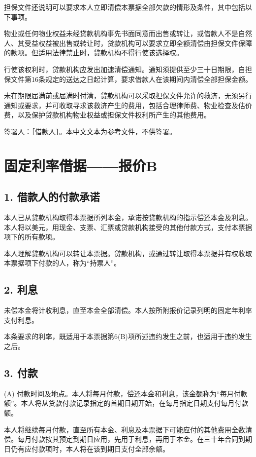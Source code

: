 \documentclass[UTF8,fontset=none,11pt,a4paper]{ctexart}
\begin{document}
担保文件还说明可以要求本人立即清偿本票据全部欠款的情形及条件，其中包括以下事项。


物业或任何物业权益未经贷款机构事先书面同意而出售或转让，或借款人不是自然人、其受益权益被出售或转让时，贷款机构可以要求立即全额清偿由担保文件保障的款项。但适用法律禁止时，贷款机构不得行使该选择权。


行使该权利时，贷款机构应发出加速清偿通知。通知须提供至少三十日期限，自担保文件第16条规定的送达之日起计算，要求借款人在该期间内清偿全部担保金额。


未在期限届满前或届满时付清，贷款机构可以采取担保文件允许的救济，无须另行通知或要求，并可收取寻求该救济产生的费用，包括合理律师费、物业检查及估价费，以及保护贷款机构物业权益或担保文件权利所产生的其他费用。


签署人：［借款人］。本中文文本为参考文件，不供签署。


\section*{固定利率借据——报价B}
\subsection*{1. 借款人的付款承诺}
本人已从贷款机构取得本票据所列本金，承诺按贷款机构的指示偿还本金及利息。本人将以美元，用现金、支票、汇票或贷款机构接受的其他付款方式，支付本票据项下的所有款项。


本人理解贷款机构可以转让本票据。贷款机构，或通过转让取得本票据并有权收取本票据项下付款的人，称为“持票人”。


\subsection*{2. 利息}
未偿本金将计收利息，直至本金全部清偿。本人按所附报价记录列明的固定年利率支付利息。


本条要求的利率，既适用于本票据第6(B)项所述违约发生之前，也适用于违约发生之后。


\subsection*{3. 付款}
(A) 付款时间及地点。本人将每月付款，偿还本金和利息，该金额称为“每月付款额”。本人将从贷款付款记录指定的首期日期开始，在每月指定日期支付每月付款额。


本人将继续每月付款，直至所有本金、利息及本票据下可能应付的其他费用全数清偿。每月付款按其预定到期日应用，先用于利息，再用于本金。在三十年合同到期日仍有应付款项时，本人将在该到期日支付全部余额。
\end{document}
